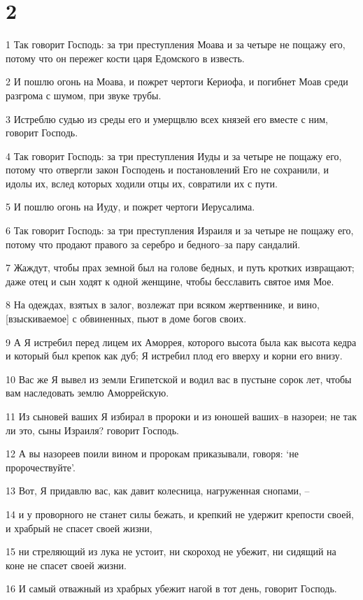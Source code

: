 \chapter{2}

\par 1 Так говорит Господь: за три преступления Моава и за четыре не пощажу его, потому что он пережег кости царя Едомского в известь.
\par 2 И пошлю огонь на Моава, и пожрет чертоги Кериофа, и погибнет Моав среди разгрома с шумом, при звуке трубы.
\par 3 Истреблю судью из среды его и умерщвлю всех князей его вместе с ним, говорит Господь.
\par 4 Так говорит Господь: за три преступления Иуды и за четыре не пощажу его, потому что отвергли закон Господень и постановлений Его не сохранили, и идолы их, вслед которых ходили отцы их, совратили их с пути.
\par 5 И пошлю огонь на Иуду, и пожрет чертоги Иерусалима.
\par 6 Так говорит Господь: за три преступления Израиля и за четыре не пощажу его, потому что продают правого за серебро и бедного--за пару сандалий.
\par 7 Жаждут, чтобы прах земной был на голове бедных, и путь кротких извращают; даже отец и сын ходят к одной женщине, чтобы бесславить святое имя Мое.
\par 8 На одеждах, взятых в залог, возлежат при всяком жертвеннике, и вино, [взыскиваемое] с обвиненных, пьют в доме богов своих.
\par 9 А Я истребил перед лицем их Аморрея, которого высота была как высота кедра и который был крепок как дуб; Я истребил плод его вверху и корни его внизу.
\par 10 Вас же Я вывел из земли Египетской и водил вас в пустыне сорок лет, чтобы вам наследовать землю Аморрейскую.
\par 11 Из сыновей ваших Я избирал в пророки и из юношей ваших--в назореи; не так ли это, сыны Израиля? говорит Господь.
\par 12 А вы назореев поили вином и пророкам приказывали, говоря: `не пророчествуйте'.
\par 13 Вот, Я придавлю вас, как давит колесница, нагруженная снопами, --
\par 14 и у проворного не станет силы бежать, и крепкий не удержит крепости своей, и храбрый не спасет своей жизни,
\par 15 ни стреляющий из лука не устоит, ни скороход не убежит, ни сидящий на коне не спасет своей жизни.
\par 16 И самый отважный из храбрых убежит нагой в тот день, говорит Господь.

